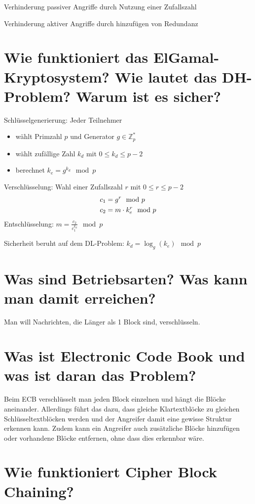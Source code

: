 \documentclass{article}
\begin{document}
	Verhinderung passiver Angriffe durch Nutzung einer Zufallszahl
	
	Verhinderung aktiver Angriffe durch hinzufügen von Redundanz
	
	\section*{Wie funktioniert das ElGamal-Kryptosystem? Wie lautet das DH-Problem? Warum ist es sicher?}
	
	Schlüsselgenerierung: Jeder Teilnehmer
	\begin{itemize}
		\item wählt Primzahl $p$ und Generator $g\in\mathbb{Z}_p^\ast$
		\item wählt zufällige Zahl $k_d$ mit $0\le k_d\le p-2$
		\item berechnet $k_e = g^{k_d}\mod p$
	\end{itemize}

	Verschlüsselung: Wahl einer Zufallszahl $r$ mit $0\le r\le p-2$
	\begin{align}
		c_1 &= g^r \mod p \notag \\
		c_2 &= m\cdot k_e^r \mod p \notag
	\end{align}
	Entschlüsselung: $m = \frac{c_2}{c_1^{k_d}} \mod p$
	
	Sicherheit beruht auf dem DL-Problem: $k_d = \log_g(k_e) \mod p$
	
	\section*{Was sind Betriebsarten? Was kann man damit erreichen?}
	
	Man will Nachrichten, die Länger als 1 Block sind, verschlüsseln.
	
	\section*{Was ist Electronic Code Book und was ist daran das Problem?}
	
	Beim ECB verschlüsselt man jeden Block einzelnen und hängt die Blöcke aneinander. Allerdings führt das dazu, dass gleiche Klartextblöcke zu gleichen Schlüsseltextblöcken werden und der Angreifer damit eine gewisse Struktur erkennen kann. Zudem kann ein Angreifer auch zusätzliche Blöcke hinzufügen oder vorhandene Blöcke entfernen, ohne dass dies erkennbar wäre.
	
	\section*{Wie funktioniert Cipher Block Chaining?}
	
\end{document}

